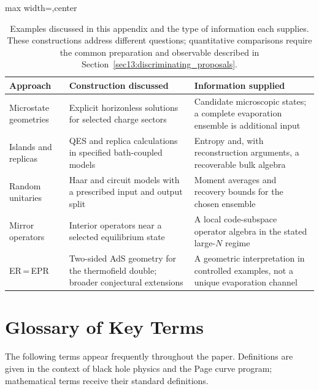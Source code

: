 \documentclass[11pt,letterpaper]{article}
\theoremstyle{plain}
\theoremstyle{definition}
\theoremstyle{remark}
\begin{document}
\begin{table}[ht]
\centering
\renewcommand{\arraystretch}{1.35}
\small
\begin{adjustbox}{max width=\textwidth,center}
\begin{tabular}{@{}p{2.5cm}p{4.8cm}p{5.2cm}@{}}
\hline
\textbf{Approach} & \textbf{Construction discussed} & \textbf{Information supplied} \\
\hline
Microstate geometries &
  Explicit horizonless solutions for selected charge sectors &
  Candidate microscopic states; a complete evaporation ensemble is additional input \\
Islands and replicas &
  QES and replica calculations in specified bath-coupled models &
  Entropy and, with reconstruction arguments, a recoverable bulk algebra \\
Random unitaries &
  Haar and circuit models with a prescribed input and output split &
  Moment averages and recovery bounds for the chosen ensemble \\
Mirror operators &
  Interior operators near a selected equilibrium state &
  A local code-subspace operator algebra in the stated large-$N$ regime \\
ER\,=\,EPR &
  Two-sided AdS geometry for the thermofield double; broader conjectural extensions &
  A geometric interpretation in controlled examples, not a unique evaporation channel \\
\hline
\end{tabular}
\end{adjustbox}
\caption{Examples discussed in this appendix and the type of information each
supplies. These constructions address different questions; quantitative
comparisons require the common preparation and observable described in
Section~\ref{sec13:discriminating_proposals}.}
\label{tab16:proposals_comparison}
\end{table}


\section{Glossary of Key Terms}
\label{app:glossary}

The following terms appear frequently throughout the paper.  Definitions are
given in the context of black hole physics and the Page curve program;
mathematical terms receive their standard definitions.
\end{document}
